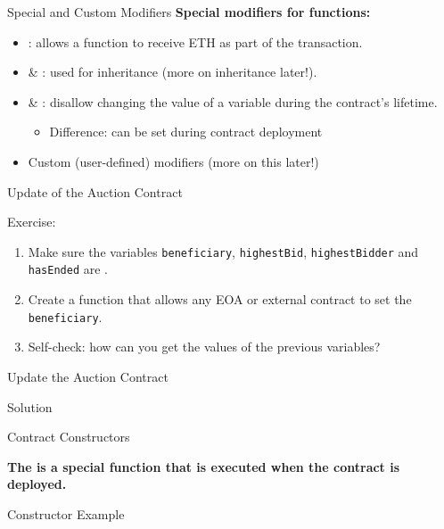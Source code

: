 \documentclass[]{beamer}
\begin{document}
\begin{frame}{Special and Custom Modifiers}
\textbf{Special modifiers for functions:}
	\begin{itemize}
		\item<1-> : allows a function to receive ETH as part of the transaction.
		\item<2->  \& : used for inheritance (\textcolor{focus}{more on inheritance later!}).
		\item<3->  \& : disallow changing the value of a variable during the contract's lifetime.
		\begin{itemize}
			\item<3->{Difference:  can be set during contract deployment}	
		\end{itemize}
		\item<4-> Custom (user-defined) modifiers (\textcolor{focus}{more on this later!})
	\end{itemize}
\end{frame}

\begin{frame}{Update of the Auction Contract}
	\begin{exercise}{Exercise:}
		\begin{enumerate}
			\item Make sure the variables \texttt{beneficiary}, \texttt{highestBid}, \texttt{highestBidder} and \texttt{hasEnded} are .
			\item Create a function that allows any EOA or external contract to set the \texttt{beneficiary}.
			\item Self-check: how can you get the values of the previous variables?
		\end{enumerate}
	\end{exercise}
\end{frame}

\begin{frame}{Update the Auction Contract}
	\begin{samplecode}{Solution}
		
	\end{samplecode}
\end{frame}

\begin{frame}{Contract Constructors}

	\textbf{The  is a special function that is executed when the contract is deployed.}
	
	\begin{samplecode}{Constructor Example}
			
	\end{samplecode}
	
\end{frame}
\end{document}
